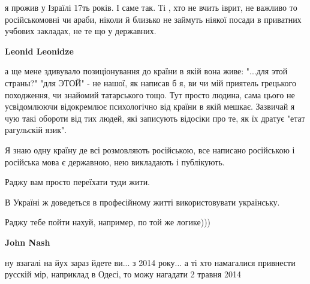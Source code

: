 \begin{itemize}
\begin{itemize}
я прожив у Ізраїлі 17ть років. І саме так. Ті , хто не вчить іврит, не важливо
то російськомовні чи араби, ніколи й близько не займуть ніякої посади в
приватних учбових закладах, не те що у державних.


 
\textbf{Leonid Leonidze} 

а ще мене здивувало позиціонування до країни в якій вона живе: "...для этой
страны?" "для ЭТОЙ" - не нашої, як написав б я, ви чи мій приятель грецького
походження, чи знайомий татарського тощо. Тут просто людина, сама цього не
усвідомлюючи відокремлює психологічно від країни в якій мешкає. Зазвичай я чую
такі обороти від тих людей, які записують відосіки про те, як їх дратує "етат
рагульскій язик".

\end{itemize}

 

Я знаю одну країну де всі розмовляють російською, все написано російською і
російська мова є державною, нею викладають і публікують.

Раджу вам просто переїхати туди жити.

В Україні ж доведеться в професійному житті використовувати українську.

\begin{itemize}
 
Раджу тебе пойти нахуй, например, по той же логике)))

 
\textbf{John Nash} 

ну взагалі на йух зараз йдете ви... з 2014 року... а ті хто намагалися
привнести русскій мір, наприклад в Одесі, то можу нагадати 2 травня 2014



\end{itemize}
\end{itemize}
